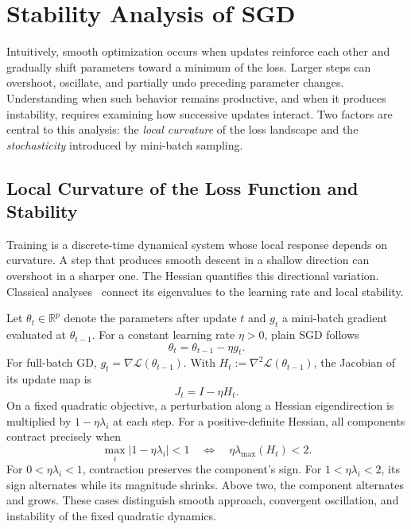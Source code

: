 \section{Stability Analysis of SGD}
\label{sec:background}

Intuitively, smooth optimization occurs when updates reinforce each other
and gradually shift parameters toward a minimum of the loss. Larger steps
can overshoot, oscillate, and partially undo preceding parameter changes.
Understanding when such behavior remains productive, and when it produces
instability, requires examining how successive updates interact. Two factors
are central to this analysis: the \textit{local curvature} of the loss
landscape and the \textit{stochasticity} introduced by mini-batch sampling.

\subsection{Local Curvature of the Loss Function and Stability}

Training is a discrete-time dynamical system whose local response depends
on curvature. A step that produces smooth descent in a shallow direction
can overshoot in a sharper one. The Hessian quantifies this directional variation. Classical
analyses~\cite{polyak1964methods, bertsekas1997nonlinear} connect its
eigenvalues to the learning rate and local stability.

Let $\theta_t\in\mathbb{R}^p$ denote the parameters after update $t$ and
$g_t$ a mini-batch gradient evaluated at $\theta_{t-1}$. For a constant
learning rate $\eta>0$, plain SGD follows
\begin{equation}
  \theta_t=\theta_{t-1}-\eta g_t.
  \label{eq:sgd_map_stability}
\end{equation}
For full-batch GD, $g_t=\nabla\mathcal L(\theta_{t-1})$. With
$H_t:=\nabla^2\mathcal L(\theta_{t-1})$, the Jacobian of its update map is
\begin{equation}
  J_t=I-\eta H_t.
  \label{eq:jacobian_sgd}
\end{equation}
On a fixed quadratic objective, a perturbation along a Hessian eigendirection
is multiplied by $1-\eta\lambda_i$ at each step. For a positive-definite
Hessian, all components contract precisely when
\begin{equation}
  \max_i|1-\eta\lambda_i|<1
  \quad\Longleftrightarrow\quad
  \eta\lambda_{\max}(H_t)<2.
  \label{eq:quad_stability_condition}
\end{equation}
For $0<\eta\lambda_i<1$, contraction preserves the component's sign.
For $1<\eta\lambda_i<2$, its sign alternates while its magnitude shrinks.
Above two, the component alternates and grows. These cases distinguish
smooth approach, convergent oscillation, and instability of the fixed
quadratic dynamics.

